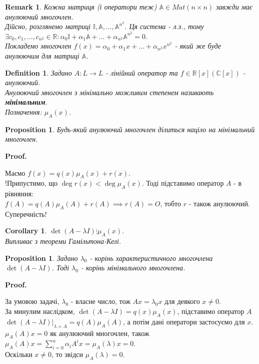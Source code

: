 \documentclass[a4paper, 10pt]{article}
\makeatletter
\theoremstyle{theoremdd}
\newtheorem{definition}[theorem]{Definition}
\newtheorem{proposition}[theorem]{Proposition}
\newtheorem{remark}[theorem]{Remark}
\newtheorem{corollary}[theorem]{Corollary}
\renewenvironment{proof}[1][Proof.\\]{\par
\pushQED{\hfill \qed}%
\normalfont \topsep6\p@\@plus6\p@\relax
\trivlist
\item\relax
{\bfseries
#1\@addpunct{.}}\hspace\labelsep\ignorespaces
}{%
\popQED\endtrivlist\@endpefalse
}
\makeatother
\begin{document}
\begin{remark}
Кожна матриця (і оператори теж) $\mathbb{A} \in Mat(n \times n)$ завжди має анулюючий многочлен.\\
Дійсно, розглянемо матриці $\mathbb{I}, \mathbb{A}, \dots, \mathbb{A}^{n^2}$. Ця система - л.з., тому\\
$\exists c_0,c_1,\dots,c_{n^2} \in \mathbb{R}: \alpha_0 \mathbb{I} + \alpha_1 \mathbb{A} + \dots + \alpha_{n^2} \mathbb{A}^{n^2} = 0$.\\
Покладемо многочлен $f(x) = \alpha_0 + \alpha_1 x + \dots + \alpha_{n^2}x^{n^2}$ - який же буде анулюючим для матриці $\mathbb{A}$.
\end{remark}

\begin{definition}
Задано $A: L \to L$ - лінійний оператор та $f \in \mathbb{R}[x] (\mathbb{C}[x])$ - анулюючий.\\
Анулюючий многочлен з мінімально можливим степенем називають \textbf{мінімальним}.\\
Позначення: $\mu_A(x)$.
\end{definition}

\begin{proposition}
Будь-який анулюючий многочлен ділиться націло на мінімальний многочлен.
\end{proposition}

\begin{proof}
Маємо $f(x) = q(x) \mu_A(x) + r(x)$.\\
!Припустимо, що $\deg r(x) < \deg \mu_A(x)$. Тоді підставимо оператор $A$ - в рівняння:\\
$f(A) = q(A) \mu_A(A) + r(A) \implies r(A) = O$, тобто $r$ - також анулюючий. Суперечність!
\end{proof}

\begin{corollary}
$\det (A-\lambda I) \vdots \mu_A(x)$.\\
\textit{Випливає з теореми Гамільтона-Келі.}
\end{corollary}

\begin{proposition}
Задано $\lambda_0$ - корінь характеристичного многочлена $\det(A-\lambda I)$. Тоді $\lambda_0$ - корінь мінімального многочлена.
\end{proposition}

\begin{proof}
За умовою задачі, $\lambda_0$ - власне число, тож $Ax = \lambda_0 x$ для деякого $x \neq 0$.\\
За минулим наслідком, $\det(A-\lambda I) = q(x)\mu_A(x)$, підставимо оператор $A$\\
$\det(A-\lambda I)|_{\lambda = A} = q(A) \mu_A(A)$, а потім дані оператори застосуємо для $x$.\\
$\mu_A(A)x = 0$ як анулюючий многочлен, також\\
$\mu_A(A)x = \displaystyle\sum_{i=0}^n \alpha_i A^ix = \mu_A(\lambda) x = 0$.\\
Оскільки $x \neq 0$, то звідси $\mu_A(\lambda) = 0$.
\end{proof}
\end{document}
